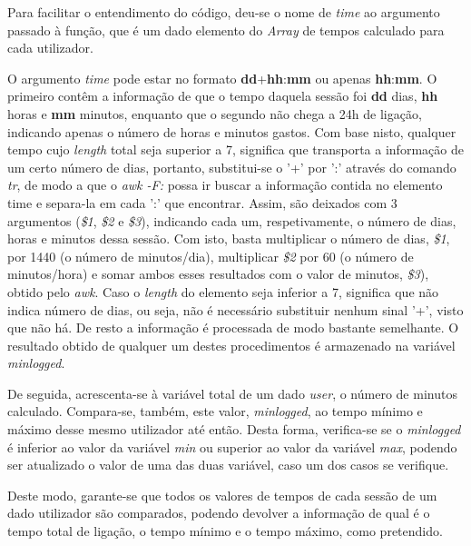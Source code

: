 \documentclass[10pt,portuguese]{article}
\begin{document}
\par Para facilitar o entendimento do código, deu-se o nome de \textit{time} ao argumento passado à função, que é um dado elemento do \textit{Array} de tempos calculado para cada utilizador.
\par O argumento \textit{time} pode estar no formato \textbf{dd}+\textbf{hh}:\textbf{mm} ou apenas \textbf{hh}:\textbf{mm}. O primeiro contêm a informação de que o tempo daquela sessão foi \textbf{dd} dias, \textbf{hh} horas e \textbf{mm} minutos, enquanto que o segundo não chega a 24h de ligação, indicando apenas o número de horas e minutos gastos. Com base nisto, qualquer tempo cujo \textit{length} total seja superior a 7, significa que transporta a informação de um certo número de dias, portanto, substitui-se o '+' por ':' através do comando \textit{tr}, de modo a que o \textit{awk -F:} possa ir buscar a informação contida no elemento time e separa-la em cada ':' que encontrar. Assim, são deixados com 3 argumentos (\textit{\$1}, \textit{\$2} e \textit{\$3}), indicando cada um, respetivamente, o número de dias, horas e minutos dessa sessão. Com isto, basta multiplicar o número de dias, \textit{\$1}, por 1440 (o número de minutos/dia), multiplicar \textit{\$2} por 60 (o número de minutos/hora) e somar ambos esses resultados com o valor de minutos, \textit{\$3}), obtido pelo \textit{awk}. Caso o \textit{length} do elemento seja inferior a 7, significa que não indica número de dias, ou seja, não é necessário substituir nenhum sinal '+', visto que não há. De resto a informação é processada de modo bastante semelhante. O resultado obtido de qualquer um destes procedimentos é armazenado na variável \textit{minlogged}. 
\par De seguida, acrescenta-se à variável total de um dado \textit{user}, o número de minutos calculado. Compara-se, também, este valor, \textit{minlogged}, ao tempo mínimo e máximo desse mesmo utilizador até então. Desta forma, verifica-se se o \textit{minlogged} é inferior ao valor da variável \textit{min} ou superior ao valor da variável \textit{max}, podendo ser atualizado o valor de uma das duas variável, caso um dos casos se verifique.
\par Deste modo, garante-se que todos os valores de tempos de cada sessão de um dado utilizador são comparados, podendo devolver a informação de qual é o tempo total de ligação, o tempo mínimo e o tempo máximo, como pretendido.
\clearpage
\end{document}
